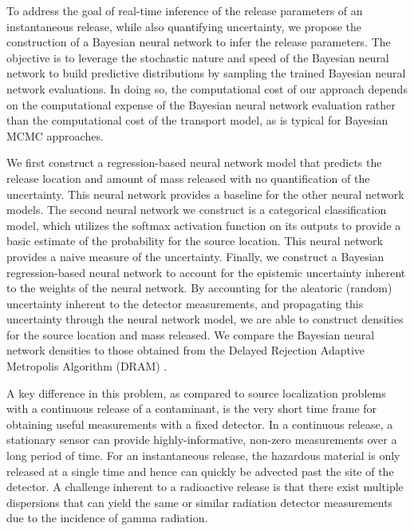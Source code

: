 \documentclass[sn-mathphys-ay]{sn-jnl}
\begin{document}
To address the goal of real-time inference of the release parameters of an instantaneous release, while also quantifying uncertainty, we propose the construction of a Bayesian neural network to infer the release parameters. The objective is to leverage the stochastic nature and speed of the Bayesian neural network to build predictive distributions by sampling the trained Bayesian neural network evaluations. In doing so, the computational cost of our approach depends on the computational expense of the Bayesian neural network evaluation rather than the computational cost of the transport model, as is typical for Bayesian MCMC approaches.

We first construct a regression-based neural network model that predicts the release location and amount of mass released with no quantification of the uncertainty. This neural network provides a baseline for the other neural network models. The second neural network we construct is a categorical classification model, which utilizes the softmax activation function on its outputs to provide a basic estimate of the probability for the source location. This neural network provides a naive measure of the uncertainty. Finally, we construct a Bayesian regression-based neural network to account for the epistemic uncertainty inherent to the weights of the neural network. By accounting for the aleatoric (random) uncertainty inherent to the detector measurements, and propagating this uncertainty through the neural network model, we are able to construct densities for the source location and mass released. We compare the Bayesian neural network densities to those obtained from the Delayed Rejection Adaptive Metropolis Algorithm (DRAM) \citep{HLMS}.

A key difference in this problem, as compared to source localization problems with a continuous release of a contaminant, is the very short time frame for obtaining useful measurements with a fixed detector. In a continuous release, a stationary sensor can provide highly-informative, non-zero measurements over a long period of time. For an instantaneous release, the hazardous material is only released at a single time and hence can quickly be advected past the site of the detector. A challenge inherent to a radioactive release is that there exist multiple dispersions that can yield the same or similar radiation detector measurements due to the incidence of gamma radiation. 
\end{document}
